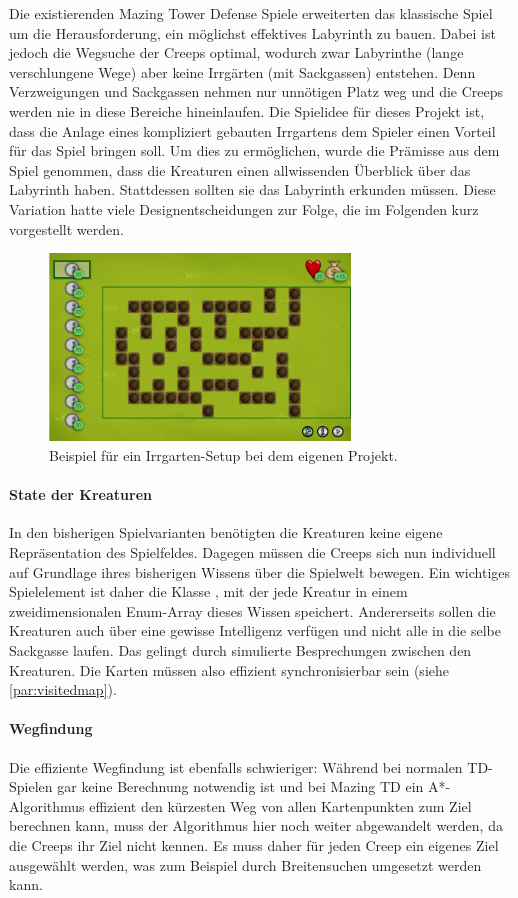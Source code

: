 Die existierenden Mazing Tower Defense Spiele erweiterten das klassische Spiel um die Herausforderung, ein möglichst effektives Labyrinth zu bauen. Dabei ist jedoch die Wegsuche der Creeps optimal, wodurch zwar Labyrinthe (lange verschlungene Wege) aber keine Irrgärten (mit Sackgassen) entstehen. Denn Verzweigungen und Sackgassen nehmen nur unnötigen Platz weg und die Creeps werden nie in diese Bereiche hineinlaufen. Die Spielidee für dieses Projekt ist, dass die Anlage eines kompliziert gebauten Irrgartens dem Spieler einen Vorteil für das Spiel bringen soll. Um dies zu ermöglichen, wurde die Prämisse aus dem Spiel genommen, dass die Kreaturen einen allwissenden Überblick über das Labyrinth haben. Stattdessen sollten sie das Labyrinth erkunden müssen. Diese Variation hatte viele Designentscheidungen zur Folge, die im Folgenden kurz vorgestellt werden.

\begin{figure}[htb]
	\centering
	\includegraphics[width=8cm]{images/maze-runner-setup.png}
	\caption{Beispiel für ein Irrgarten-Setup bei dem eigenen Projekt.}
\end{figure}

\paragraph{State der Kreaturen} In den bisherigen Spielvarianten benötigten die Kreaturen keine eigene Repräsentation des Spielfeldes. Dagegen müssen die Creeps sich nun individuell auf Grundlage ihres bisherigen Wissens über die Spielwelt bewegen. Ein wichtiges Spielelement ist daher die Klasse , mit der jede Kreatur in einem zweidimensionalen Enum-Array dieses Wissen speichert. Andererseits sollen die Kreaturen auch über eine gewisse Intelligenz verfügen und nicht alle in die selbe Sackgasse laufen. Das gelingt durch simulierte Besprechungen zwischen den Kreaturen. Die Karten müssen also effizient synchronisierbar sein (siehe \ref{par:visitedmap}).

\paragraph{Wegfindung} Die effiziente Wegfindung ist ebenfalls schwieriger: Während bei normalen TD-Spielen gar keine Berechnung notwendig ist und bei Mazing TD ein A*-Algorithmus effizient den kürzesten Weg von allen Kartenpunkten zum Ziel berechnen kann, muss der Algorithmus hier noch weiter abgewandelt werden, da die Creeps ihr Ziel nicht kennen. Es muss daher für jeden Creep ein eigenes Ziel ausgewählt werden, was zum Beispiel durch Breitensuchen umgesetzt werden kann.

